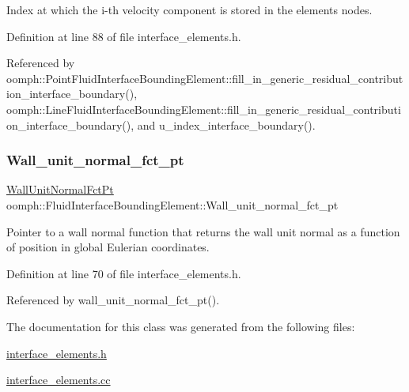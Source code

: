 Index at which the i-\/th velocity component is stored in the element\textquotesingle{}s nodes. 



Definition at line 88 of file interface\+\_\+elements.\+h.



Referenced by oomph\+::\+Point\+Fluid\+Interface\+Bounding\+Element\+::fill\+\_\+in\+\_\+generic\+\_\+residual\+\_\+contribution\+\_\+interface\+\_\+boundary(), oomph\+::\+Line\+Fluid\+Interface\+Bounding\+Element\+::fill\+\_\+in\+\_\+generic\+\_\+residual\+\_\+contribution\+\_\+interface\+\_\+boundary(), and u\+\_\+index\+\_\+interface\+\_\+boundary().

\mbox{\label{classoomph_1_1FluidInterfaceBoundingElement_abc765a3b2c4eac762a1a5ba85ac4a7a4}} 
\subsubsection{\texorpdfstring{Wall\+\_\+unit\+\_\+normal\+\_\+fct\+\_\+pt}{Wall\_unit\_normal\_fct\_pt}}
{\footnotesize\ttfamily \hyperlink{classoomph_1_1FluidInterfaceBoundingElement_a09c0b1df7d653eaf55e94e3951d409dd}{Wall\+Unit\+Normal\+Fct\+Pt} oomph\+::\+Fluid\+Interface\+Bounding\+Element\+::\+Wall\+\_\+unit\+\_\+normal\+\_\+fct\+\_\+pt\hspace{0.3cm}{\ttfamily [private]}}



Pointer to a wall normal function that returns the wall unit normal as a function of position in global Eulerian coordinates. 



Definition at line 70 of file interface\+\_\+elements.\+h.



Referenced by wall\+\_\+unit\+\_\+normal\+\_\+fct\+\_\+pt().



The documentation for this class was generated from the following files\+:\begin{DoxyCompactItemize}
\item 
\hyperlink{interface__elements_8h}{interface\+\_\+elements.\+h}\item 
\hyperlink{interface__elements_8cc}{interface\+\_\+elements.\+cc}\end{DoxyCompactItemize}
